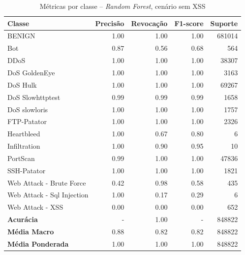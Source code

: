 \begin{table}[H]
    \centering
    \small
    \begin{tabular}{lrrrr}
        \hline
        Classe                     & Precisão & Revocação & F1-score & Suporte \\
        \hline
        BENIGN                     & 1.00     & 1.00      & 1.00     & 681014  \\
        Bot                        & 0.87     & 0.56      & 0.68     & 564     \\
        DDoS                       & 1.00     & 1.00      & 1.00     & 38307   \\
        DoS GoldenEye              & 1.00     & 1.00      & 1.00     & 3163    \\
        DoS Hulk                   & 1.00     & 1.00      & 1.00     & 69267   \\
        DoS Slowhttptest           & 0.99     & 0.99      & 0.99     & 1658    \\
        DoS slowloris              & 1.00     & 1.00      & 1.00     & 1757    \\
        FTP-Patator                & 1.00     & 1.00      & 1.00     & 2326    \\
        Heartbleed                 & 1.00     & 0.67      & 0.80     & 6       \\
        Infiltration               & 1.00     & 0.90      & 0.95     & 10      \\
        PortScan                   & 0.99     & 1.00      & 1.00     & 47836   \\
        SSH-Patator                & 1.00     & 1.00      & 1.00     & 1821    \\
        Web Attack - Brute Force   & 0.42     & 0.98      & 0.58     & 435     \\
        Web Attack - Sql Injection & 1.00     & 0.17      & 0.29     & 6       \\
        Web Attack - XSS           & 0.00     & 0.00      & 0.00     & 652     \\
        \hline
        \textbf{Acurácia}          & -        & 1.00      & -        & 848822  \\
        \textbf{Média Macro}       & 0.88     & 0.82      & 0.82     & 848822  \\
        \textbf{Média Ponderada}   & 1.00     & 1.00      & 1.00     & 848822  \\
        \hline
    \end{tabular}
    \caption{Métricas por classe -- \textit{Random Forest}, cenário sem XSS}
    \label{table:rf_Sem_XSS_metricas}
\end{table}